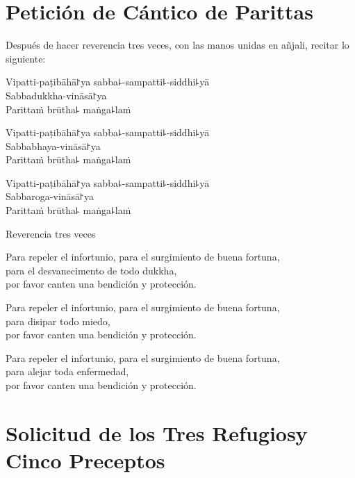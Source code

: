 \clearpage
\chapter{Petición de Cántico de Parittas}

\begin{instruction}
  Después de hacer reverencia tres veces, con las manos unidas en añjali, recitar lo siguiente:
\end{instruction}

Vipatti-paṭibāhā꜓ya sabba꜕-sampatti꜕-siddhi꜕yā\\
Sabbadukkha-vināsā꜓ya\\
Parittaṁ brūtha꜕ maṅga꜕laṁ

Vipatti-paṭibāhā꜓ya sabba꜕-sampatti꜕-siddhi꜕yā\\
Sabbabhaya-vināsā꜓ya\\
Parittaṁ brūtha꜕ maṅga꜕laṁ

Vipatti-paṭibāhā꜓ya sabba꜕-sampatti꜕-siddhi꜕yā\\
Sabbaroga-vināsā꜓ya\\
Parittaṁ brūtha꜕ maṅga꜕laṁ

\begin{instruction}
  Reverencia tres veces
\end{instruction}

\begin{english}
Para repeler el infortunio, para el surgimiento de buena fortuna,\\
para el desvanecimento de todo dukkha,\\
por favor canten una bendición y protección.

Para repeler el infortunio, para el surgimiento de buena fortuna,\\
para disipar todo miedo,\\
por favor canten una bendición y protección.

Para repeler el infortunio, para el surgimiento de buena fortuna,\\
para alejar toda enfermedad,\\
por favor canten una bendición y protección.
\end{english}

\setlength{\englishIndent}{\leaderIndent}

\clearpage
\chapter[Tres Refugios y Cinco Preceptos]{Solicitud de los Tres Refugios\newline y Cinco Preceptos}

